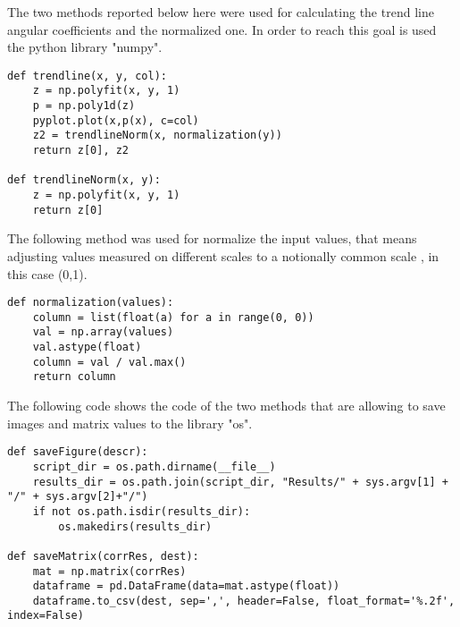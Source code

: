 The two methods reported below here were used for calculating the trend line angular coefficients and the normalized one. In order to reach this goal is used the python library "numpy".
\begin{lstlisting}
def trendline(x, y, col):
	z = np.polyfit(x, y, 1)
	p = np.poly1d(z)
	pyplot.plot(x,p(x), c=col)
	z2 = trendlineNorm(x, normalization(y))
	return z[0], z2

def trendlineNorm(x, y):
	z = np.polyfit(x, y, 1)
	return z[0]
\end{lstlisting}

The following method was used for normalize the input values, that means adjusting values measured on different scales to a notionally common scale , in this case (0,1).
\begin{lstlisting}
def normalization(values):
	column = list(float(a) for a in range(0, 0))
	val = np.array(values)
	val.astype(float)
	column = val / val.max()
	return column
\end{lstlisting}

The following code shows the code of the two methods that are allowing to save images and matrix values to the library "os". 
\begin{lstlisting}
def saveFigure(descr):
    script_dir = os.path.dirname(__file__)
    results_dir = os.path.join(script_dir, "Results/" + sys.argv[1] + "/" + sys.argv[2]+"/")
    if not os.path.isdir(results_dir):
        os.makedirs(results_dir)

def saveMatrix(corrRes, dest):
	mat = np.matrix(corrRes)
	dataframe = pd.DataFrame(data=mat.astype(float))
	dataframe.to_csv(dest, sep=',', header=False, float_format='%.2f', index=False)
\end{lstlisting}

